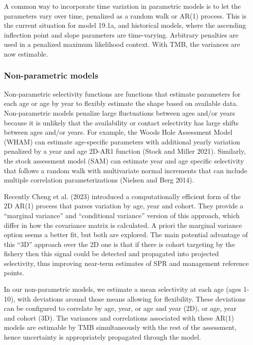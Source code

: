\documentclass[
]{article}
\begin{document}
A common way to incorporate time variation in parametric models is to
let the parameters vary over time, penalized as a random walk or AR(1)
process. This is the current situation for model 19.1a, and historical
models, where the ascending inflection point and slope parameters are
time-varying. Arbitrary penalties are used in a penalized maximum
likelihood context. With TMB, the variances are now estimable.

\hypertarget{non-parametric-models}{%
\subsubsection{Non-parametric models}\label{non-parametric-models}}

Non-parametric selectivity functions are functions that estimate
parameters for each age or age by year to flexibly estimate the shape
based on available data. Non-parametric models penalize large
fluctuations between ages and/or years because it is unlikely that the
availability or contact selectivity has large shifts between ages and/or
years. For example, the Woods Hole Assessment Model (WHAM) can estimate
age-specific parameters with additional yearly variation penalized by a
year and age 2D-AR1 function (Stock and Miller 2021). Similarly, the
stock assessment model (SAM) can estimate year and age specific
selectivity that follows a random walk with multivariate normal
increments that can include multiple correlation parameterizations
(Nielsen and Berg 2014).

Recently Cheng et al. (2023) introduced a computationally efficient form
of the 2D AR(1) process that parses variation by age, year and cohort.
They provide a ``marginal variance'' and ``conditional variance''
version of this approach, which differ in how the covariance matrix is
calculated. A priori the marginal variance option seems a better fit,
but both are explored. The main potential advantage of this ``3D''
approach over the 2D one is that if there is cohort targeting by the
fishery then this signal could be detected and propagated into projected
selectivity, thus improving near-term estimates of SPR and management
reference points.

In our non-parametric models, we estimate a mean selectivity at each age
(ages 1-10), with deviations around those means allowing for
flexibility. These deviations can be configured to correlate by age,
year, or age and year (2D), or age, year and cohort (3D). The variances
and correlations associated with these AR(1) models are estimable by TMB
simultaneously with the rest of the assessment, hence uncertainty is
appropriately propagated through the model.
\end{document}
